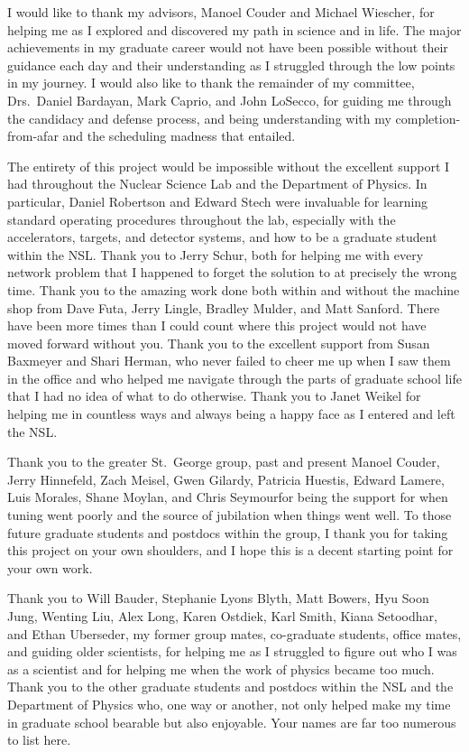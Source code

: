 
\begin{acknowledge}

I would like to thank my advisors, Manoel Couder and Michael Wiescher,
for helping me as I explored and discovered my path in science and in
life. The major achievements in my graduate career would not have been
possible without their guidance each day and their understanding as I
struggled through the low points in my journey. I would also like to
thank the remainder of my committee, Drs.\ Daniel Bardayan, Mark Caprio,
and John LoSecco, for guiding me through the candidacy and defense
process, and being understanding with my completion-from-afar and the
scheduling madness that entailed.

The entirety of this project would be impossible without the excellent
support I had throughout the Nuclear Science Lab and the Department of
Physics. In particular, Daniel Robertson and Edward Stech were
invaluable for learning standard operating procedures throughout the
lab, especially with the accelerators, targets, and detector systems,
and how to be a graduate student within the NSL. Thank you to Jerry
Schur, both for helping me with every network problem that I happened to
forget the solution to at precisely the wrong time. Thank you to the
amazing work done both within and without the machine shop from Dave
Futa, Jerry Lingle, Bradley Mulder, and Matt Sanford. There have been
more times than I could count where this project would not have moved
forward without you. Thank you to the excellent support from Susan
Baxmeyer and Shari Herman, who never failed to cheer me up when I saw
them in the office and who helped me navigate through the parts of
graduate school life that I had no idea of what to do otherwise. Thank
you to Janet Weikel for helping me in countless ways and always being a
happy face as I entered and left the NSL.

Thank you to the greater St.\ George group, past and
present\textemdash{} Manoel Couder, Jerry Hinnefeld, Zach Meisel, Gwen
Gilardy, Patricia Huestis, Edward Lamere, Luis Morales, Shane Moylan,
and Chris Seymour\textemdash{}for being the support for when tuning went
poorly and the source of jubilation when things went well. To those
future graduate students and postdocs within the group, I thank you for
taking this project on your own shoulders, and I hope this is a decent
starting point for your own work.

Thank you to Will Bauder, Stephanie Lyons Blyth, Matt Bowers, Hyu Soon
Jung, Wenting Liu, Alex Long, Karen Ostdiek, Karl Smith, Kiana
Setoodhar, and Ethan Uberseder, my former group mates, co-graduate
students, office mates, and guiding older scientists, for helping me as
I struggled to figure out who I was as a scientist and for helping me
when the work of physics became too much. Thank you to the other
graduate students and postdocs within the NSL and the Department of
Physics who, one way or another, not only helped make my time in
graduate school bearable but also enjoyable. Your names are far too
numerous to list here.


\end{acknowledge}
